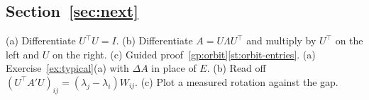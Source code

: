 \subsection*{Section~\ref{sec:next}}
\begin{hintlist}
 (a) Differentiate $U^\top U=I$. (b) Differentiate $A=U\Lambda U^\top$ and multiply by
$U^\top$ on the left and $U$ on the right. (c) Guided proof~\ref{gp:orbit}\ref{st:orbit-entries}.
 (a) Exercise~\ref{ex:typical}(a) with $\Delta A$ in place of $E$. (b) Read off
$(U^\top A'U)_{ij}=(\lambda_j-\lambda_i)W_{ij}$. (c) Plot a measured rotation against the gap.
\end{hintlist}
